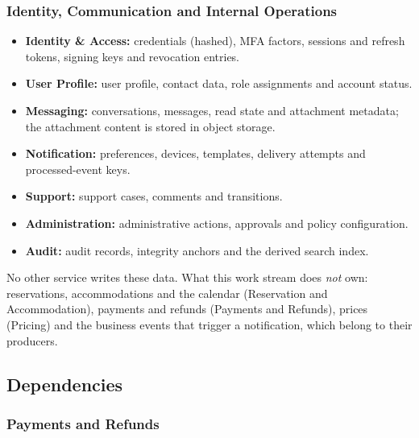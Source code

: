 \begingroup
\setlength{\emergencystretch}{3em}
\subsubsection{Identity, Communication and Internal Operations}
\label{sec:id-owned}

\begin{itemize}
  \item \textbf{Identity \& Access:} credentials (hashed), MFA factors,
    sessions and refresh tokens, signing keys and revocation entries.
  \item \textbf{User Profile:} user profile, contact data, role assignments
    and account status.
  \item \textbf{Messaging:} conversations, messages, read state and
    attachment metadata; the attachment content is stored in object storage.
  \item \textbf{Notification:} preferences, devices, templates, delivery
    attempts and processed-event keys.
  \item \textbf{Support:} support cases, comments and transitions.
  \item \textbf{Administration:} administrative actions, approvals and policy
    configuration.
  \item \textbf{Audit:} audit records, integrity anchors and the derived
    search index.
\end{itemize}
No other service writes these data. What this work stream does \emph{not}
own: reservations, accommodations and the calendar (Reservation and
Accommodation), payments and refunds (Payments and Refunds), prices
(Pricing) and the business events that trigger a notification, which belong
to their producers.
\endgroup

\subsection{Dependencies}

\begingroup
\setlength{\emergencystretch}{3em}
\subsubsection{Payments and Refunds}
\label{sec:pay-dependencies}

